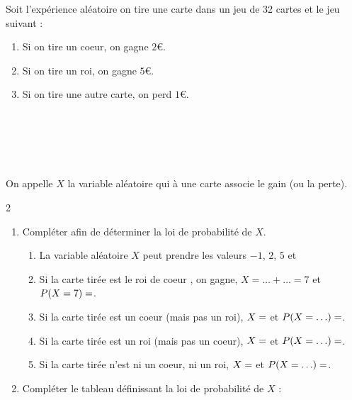 \documentclass[main.tex]{subfiles}
\begin{document}
\begin{exercise} Soit l'expérience aléatoire \og on tire une carte dans un jeu de 32 cartes \fg et le jeu suivant : \hfill \\
\noindent
\parbox{0.65\linewidth}{ 
	\begin{enumerate}[leftmargin=*,label=\textbullet]
		\item  Si on tire un coeur, on gagne $2$\euro.
		\item  Si on tire un roi, on gagne $5$\euro.
		\item  Si on tire une autre carte, on perd $1$\euro.
\end{enumerate}
}
\hfill  
\parbox{0.3\linewidth}{
 \\
 \\
 \\
}\medskip\\ 
On appelle $X$ la variable aléatoire qui à une carte associe le gain (ou la perte).
\vspace{-0.25em}
\begin{spacing}{2} 
\begin{enumerate}[leftmargin=*,label=\arabic*)]
	\item Compléter afin de déterminer la loi de probabilité de $X$. 
\begin{enumerate}[leftmargin=*,label={}]   
	\item  La variable aléatoire $X$ peut prendre les valeurs $-1$, $2$, $5$ et \dotfill  
	\item  Si la carte tirée est le roi de coeur , on gagne, $X =\ldots+ \ldots=7$ et $P(X = 7) = \dotfill $.
	\item  Si la carte tirée est un coeur (mais pas un roi), $X = \dotfill $ et $P(X = \ldots) = \dotfill$.
	\item  Si la carte tirée est un roi (mais pas un coeur), $X = \dotfill $ et $P(X = \ldots) = \dotfill$.
	\item  Si la carte tirée n'est ni un coeur, ni un roi, $X = \dotfill $ et $P(X = \ldots) = \dotfill$.
	\end{enumerate}
\item Compléter le tableau définissant la loi de probabilité de $X$ :\\
\renewcommand{\arraystretch}{1.1} 

\end{enumerate}
\end{spacing}
\end{exercise}
\end{document}
